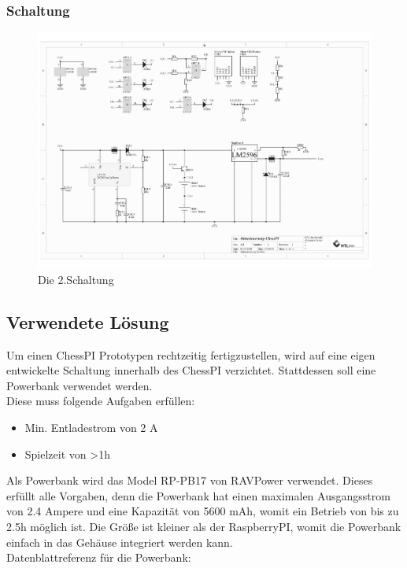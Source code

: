 \documentclass[12pt,a4paper]{article}
\begin{document}
{\subsubsection{Schaltung}
\label{SUBSUBSEC:CIRCUIT-2}
\begin{figure}[H]
  \centering
		\includegraphics[scale=0.7, angle=90]{graphics/20171104-Shematics.pdf}
		\caption{Die 2.Schaltung}
		\label{fig:circuit2}
\end{figure}

\newpage
\subsection{Verwendete Lösung}
\label{SUBSEC:POWERBANK}

Um einen ChessPI Prototypen rechtzeitig fertigzustellen, wird auf eine eigen entwickelte Schaltung innerhalb des ChessPI verzichtet. Stattdessen soll eine Powerbank verwendet werden. \\
Diese muss folgende Aufgaben erfüllen:
\begin{itemize}
	\item{Min. Entladestrom von 2 A}
	\item{Spielzeit von >1h}
\end{itemize}

Als Powerbank wird das Model RP-PB17 von RAVPower verwendet. Dieses erfüllt alle Vorgaben, denn die Powerbank hat einen maximalen Ausgangsstrom von 2.4 Ampere und eine Kapazität von 5600 mAh, womit ein Betrieb von bis zu 2.5h möglich ist. Die Größe ist kleiner als der RaspberryPI, womit die Powerbank einfach in das Gehäuse integriert werden kann. \\
Datenblattreferenz für die Powerbank: \cite{Powerbank}

}
\end{document}
